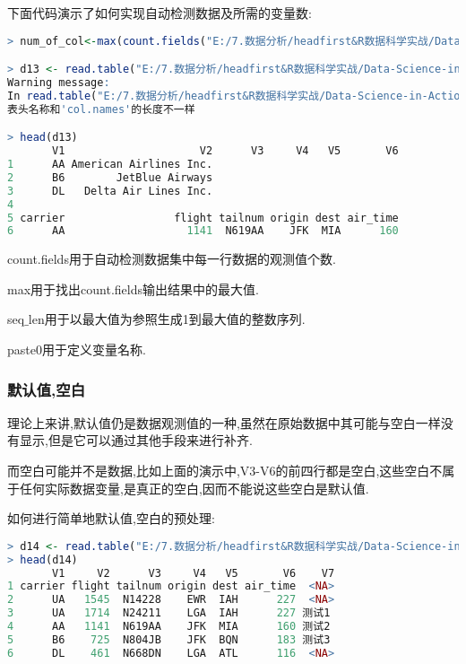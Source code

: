\documentclass[11pt,a4paper,oneside]{book}
\begin{document}
下面代码演示了如何实现自动检测数据及所需的变量数:
\begin{lstlisting}[language=r]
> num_of_col<-max(count.fields("E:/7.数据分析/headfirst&R数据科学实战/Data-Science-in-Action-R-Tools-and-Case-Studies-master/chapter1/RawData/airlines.csv"))

> d13 <- read.table("E:/7.数据分析/headfirst&R数据科学实战/Data-Science-in-Action-R-Tools-and-Case-Studies-master/chapter1/RawData/airlines.csv",header=T,sep="\t",col.names=paste0("V",seq_len(num_of_col)),blank.lines.skip = FALSE,stringsAsFactors = FALSE)
Warning message:
In read.table("E:/7.数据分析/headfirst&R数据科学实战/Data-Science-in-Action-R-Tools-and-Case-Studies-master/chapter1/RawData/airlines.csv",  :
表头名称和'col.names'的长度不一样

> head(d13)
       V1                     V2      V3     V4   V5       V6
1      AA American Airlines Inc.                             
2      B6        JetBlue Airways                             
3      DL   Delta Air Lines Inc.                             
4                                                            
5 carrier                 flight tailnum origin dest air_time
6      AA                   1141  N619AA    JFK  MIA      160
\end{lstlisting}

count.fields用于自动检测数据集中每一行数据的观测值个数.

max用于找出count.fields输出结果中的最大值.

seq$ \_ $len用于以最大值为参照生成1到最大值的整数序列.

paste0用于定义变量名称.

\subsubsection{默认值,空白}
理论上来讲,默认值仍是数据观测值的一种,虽然在原始数据中其可能与空白一样没有显示,但是它可以通过其他手段来进行补齐.

而空白可能并不是数据,比如上面的演示中,V3-V6的前四行都是空白,这些空白不属于任何实际数据变量,是真正的空白,因而不能说这些空白是默认值.

如何进行简单地默认值,空白的预处理:
\begin{lstlisting}[language=r]
> d14 <- read.table("E:/7.数据分析/headfirst&R数据科学实战/Data-Science-in-Action-R-Tools-and-Case-Studies-master/chapter1/RawData/flights_uneven.csv",header=F,sep="\t",na.strings = c(""),fill=T,stringsAsFactors = FALSE)
> head(d14)
       V1     V2      V3     V4   V5       V6    V7
1 carrier flight tailnum origin dest air_time  <NA>
2      UA   1545  N14228    EWR  IAH      227  <NA>
3      UA   1714  N24211    LGA  IAH      227 测试1
4      AA   1141  N619AA    JFK  MIA      160 测试2
5      B6    725  N804JB    JFK  BQN      183 测试3
6      DL    461  N668DN    LGA  ATL      116  <NA>
\end{lstlisting}
\end{document}
